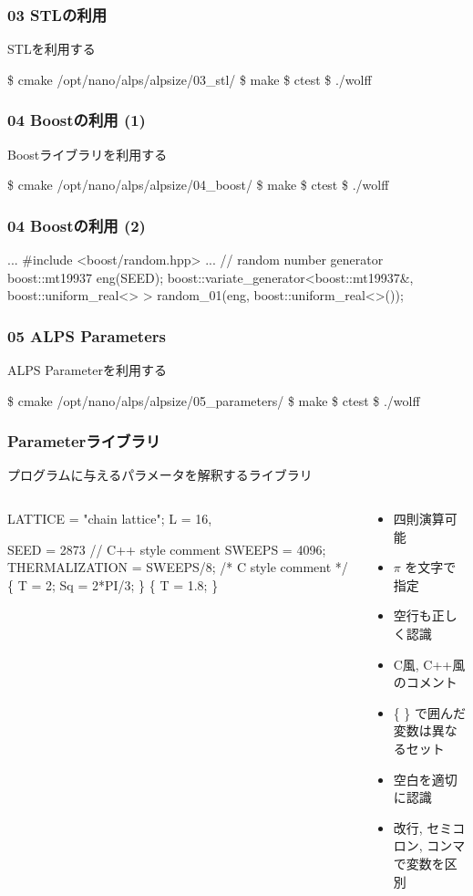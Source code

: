 \begin{frame}[fragile]
  \frametitle{03 STLの利用}
  STLを利用する
\begin{semiverbatim}
\$ cmake /opt/nano/alps/alpsize/03_stl/
\$ make
\$ ctest
\$ ./wolff
\end{semiverbatim}
\end{frame}

\begin{frame}[fragile]
  \frametitle{04 Boostの利用 (1)}
  Boostライブラリを利用する
\begin{semiverbatim}
\$ cmake /opt/nano/alps/alpsize/04_boost/
\$ make
\$ ctest
\$ ./wolff
\end{semiverbatim}
\end{frame}

\begin{frame}[fragile,shrink=10]
  \frametitle{04 Boostの利用 (2)}
\begin{semiverbatim}
...
#include <boost/random.hpp>
...
// random number generator
boost::mt19937 eng(SEED);
boost::variate_generator<boost::mt19937&, boost::uniform_real<> >
random_01(eng, boost::uniform_real<>());
\end{semiverbatim}
\end{frame}

\begin{frame}[fragile]
  \frametitle{05 ALPS Parameters}
  ALPS Parameterを利用する
\begin{semiverbatim}
\$ cmake /opt/nano/alps/alpsize/05_parameters/
\$ make
\$ ctest
\$ ./wolff
\end{semiverbatim}
\end{frame}

\begin{frame}[fragile] \frametitle{Parameterライブラリ}
  プログラムに与えるパラメータを解釈するライブラリ
  \begin{columns}
    \begin{column}{6cm}
\begin{semiverbatim}
LATTICE = "chain lattice";
L = 16,

SEED = 2873
// C++ style comment
SWEEPS = 4096;
THERMALIZATION = \alert<1>{SWEEPS/8};
/* C style comment */
\{ T = 2; Sq = 2*\alert<2>{PI}/3; \}
\{ T = 1.8; \}
\end{semiverbatim}
    \end{column}
    \begin{column}{6cm}
      \begin{itemize}
      \item 四則演算可能
      \item $\pi$ を文字で指定
      \item 空行も正しく認識
      \item C風, C++風のコメント
      \item \{ \} で囲んだ変数は異なるセット
      \item 空白を適切に認識
      \item 改行, セミコロン, コンマで変数を区別
      \end{itemize}
    \end{column}
  \end{columns}
\end{frame}

